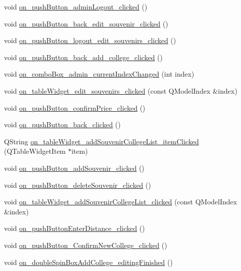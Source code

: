 \begin{DoxyCompactItemize}
\item 
void \hyperlink{class_main_window_a5f018c05e98cb69074411c9b9fc04b63}{on\+\_\+push\+Button\+\_\+admin\+Logout\+\_\+clicked} ()
\item 
void \hyperlink{class_main_window_a51fee87e3c3469b2c213d4963bcd5d41}{on\+\_\+push\+Button\+\_\+back\+\_\+edit\+\_\+souvenir\+\_\+clicked} ()
\item 
void \hyperlink{class_main_window_a13b5b2dfe9884c80f7990a07c309025d}{on\+\_\+push\+Button\+\_\+logout\+\_\+edit\+\_\+souvenirs\+\_\+clicked} ()
\item 
void \hyperlink{class_main_window_a96ce45dbf8272b2af3eff606eba62a29}{on\+\_\+push\+Button\+\_\+back\+\_\+add\+\_\+college\+\_\+clicked} ()
\item 
void \hyperlink{class_main_window_ad3204768a32b29d585df6f3af600d79d}{on\+\_\+combo\+Box\+\_\+admin\+\_\+current\+Index\+Changed} (int index)
\item 
void \hyperlink{class_main_window_a0e7985b406942f60471c7a8153c6c11e}{on\+\_\+table\+Widget\+\_\+edit\+\_\+souvenirs\+\_\+clicked} (const Q\+Model\+Index \&index)
\item 
void \hyperlink{class_main_window_a7eaa50783a67b554b86116bb5ac30b16}{on\+\_\+push\+Button\+\_\+confirm\+Price\+\_\+clicked} ()
\item 
void \hyperlink{class_main_window_af94e6372d005b6a88d3cca0e5892f18d}{on\+\_\+push\+Button\+\_\+back\+\_\+clicked} ()
\item 
Q\+String \hyperlink{class_main_window_ae31657dfcbd900e46e58e7b6c8868254}{on\+\_\+table\+Widget\+\_\+add\+Souvenir\+College\+List\+\_\+item\+Clicked} (Q\+Table\+Widget\+Item $\ast$item)
\item 
void \hyperlink{class_main_window_a3806de8211da85581228722e2dff27ef}{on\+\_\+push\+Button\+\_\+add\+Souvenir\+\_\+clicked} ()
\item 
void \hyperlink{class_main_window_ae2bacca2cae11c9533f88ad4680d9a21}{on\+\_\+push\+Button\+\_\+delete\+Souvenir\+\_\+clicked} ()
\item 
void \hyperlink{class_main_window_aebea17f2f77e71cfca0cbbfbfe2223e0}{on\+\_\+table\+Widget\+\_\+add\+Souvenir\+College\+List\+\_\+clicked} (const Q\+Model\+Index \&index)
\item 
void \hyperlink{class_main_window_a2942463165f2f1838d0633eac1cefc01}{on\+\_\+push\+Button\+Enter\+Distance\+\_\+clicked} ()
\item 
void \hyperlink{class_main_window_ae122b3219efb455a0425b8ec65345862}{on\+\_\+push\+Button\+\_\+\+Confirm\+New\+College\+\_\+clicked} ()
\item 
void \hyperlink{class_main_window_ab79b13b737d123796e2ba03c6c2a7307}{on\+\_\+double\+Spin\+Box\+Add\+College\+\_\+editing\+Finished} ()
\end{DoxyCompactItemize}
